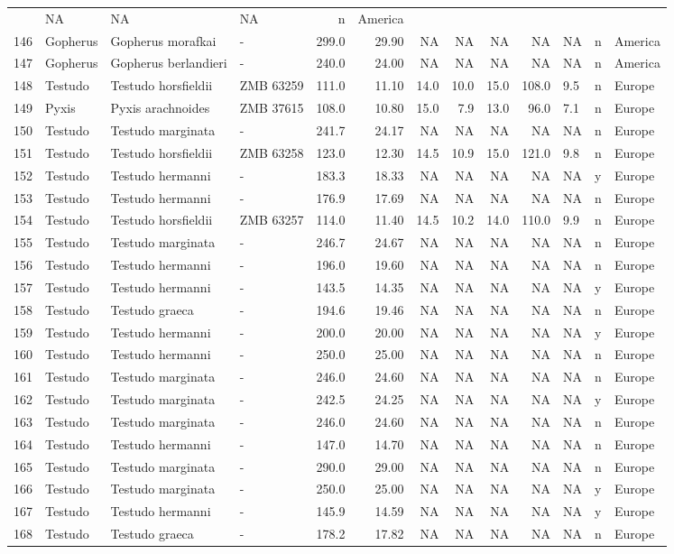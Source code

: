 \begin{landscape}
{\begin{longtable}[]{@{}llllrrrrrrlll@{}}
	& NA & NA & NA & n & America\tabularnewline
	146 & Gopherus & Gopherus morafkai & - & 299.0 & 29.90 & NA & NA & NA &
	NA & NA & n & America\tabularnewline
	147 & Gopherus & Gopherus berlandieri & - & 240.0 & 24.00 & NA & NA & NA
	& NA & NA & n & America\tabularnewline
	148 & Testudo & Testudo horsfieldii & ZMB 63259 & 111.0 & 11.10 & 14.0 &
	10.0 & 15.0 & 108.0 & 9.5 & n & Europe\tabularnewline
	149 & Pyxis & Pyxis arachnoides & ZMB 37615 & 108.0 & 10.80 & 15.0 & 7.9
	& 13.0 & 96.0 & 7.1 & n & Europe\tabularnewline
	150 & Testudo & Testudo marginata & - & 241.7 & 24.17 & NA & NA & NA &
	NA & NA & n & Europe\tabularnewline
	151 & Testudo & Testudo horsfieldii & ZMB 63258 & 123.0 & 12.30 & 14.5 &
	10.9 & 15.0 & 121.0 & 9.8 & n & Europe\tabularnewline
	152 & Testudo & Testudo hermanni & - & 183.3 & 18.33 & NA & NA & NA & NA
	& NA & y & Europe\tabularnewline
	153 & Testudo & Testudo hermanni & - & 176.9 & 17.69 & NA & NA & NA & NA
	& NA & n & Europe\tabularnewline
	154 & Testudo & Testudo horsfieldii & ZMB 63257 & 114.0 & 11.40 & 14.5 &
	10.2 & 14.0 & 110.0 & 9.9 & n & Europe\tabularnewline
	155 & Testudo & Testudo marginata & - & 246.7 & 24.67 & NA & NA & NA &
	NA & NA & n & Europe\tabularnewline
	156 & Testudo & Testudo hermanni & - & 196.0 & 19.60 & NA & NA & NA & NA
	& NA & n & Europe\tabularnewline
	157 & Testudo & Testudo hermanni & - & 143.5 & 14.35 & NA & NA & NA & NA
	& NA & y & Europe\tabularnewline
	158 & Testudo & Testudo graeca & - & 194.6 & 19.46 & NA & NA & NA & NA &
	NA & n & Europe\tabularnewline
	159 & Testudo & Testudo hermanni & - & 200.0 & 20.00 & NA & NA & NA & NA
	& NA & y & Europe\tabularnewline
	160 & Testudo & Testudo hermanni & - & 250.0 & 25.00 & NA & NA & NA & NA
	& NA & n & Europe\tabularnewline
	161 & Testudo & Testudo marginata & - & 246.0 & 24.60 & NA & NA & NA &
	NA & NA & n & Europe\tabularnewline
	162 & Testudo & Testudo marginata & - & 242.5 & 24.25 & NA & NA & NA &
	NA & NA & y & Europe\tabularnewline
	163 & Testudo & Testudo marginata & - & 246.0 & 24.60 & NA & NA & NA &
	NA & NA & n & Europe\tabularnewline
	164 & Testudo & Testudo hermanni & - & 147.0 & 14.70 & NA & NA & NA & NA
	& NA & n & Europe\tabularnewline
	165 & Testudo & Testudo marginata & - & 290.0 & 29.00 & NA & NA & NA &
	NA & NA & n & Europe\tabularnewline
	166 & Testudo & Testudo marginata & - & 250.0 & 25.00 & NA & NA & NA &
	NA & NA & y & Europe\tabularnewline
	167 & Testudo & Testudo hermanni & - & 145.9 & 14.59 & NA & NA & NA & NA
	& NA & y & Europe\tabularnewline
	168 & Testudo & Testudo graeca & - & 178.2 & 17.82 & NA & NA & NA & NA &
	NA & n & Europe\tabularnewline

\end{longtable}}
\end{landscape}
